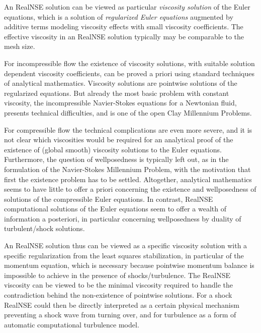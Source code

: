 An RealNSE solution can be viewed as particular \emph{viscosity solution}
of the Euler equations, which is a solution of \emph{regularized 
Euler equations} augmented by additive terms modeling viscosity
effects with small viscosity coefficients. The effective viscosity in an 
RealNSE solution typically may be comparable to the mesh size.

For incompressible flow the existence of viscosity solutions,
with suitable solution dependent viscosity coefficients, can
be proved a priori using standard techniques of analytical mathematics.
Viscosity solutions are pointwise solutions of the regularized 
equations. 
But already the most basic problem with constant viscosity,
the incompressible Navier-Stokes equations for a Newtonian fluid, presents
technical difficulties, and is one of the open Clay Millennium Problems.

For compressible flow the technical complications are even more
severe, and it is not clear which viscosities would be required 
for an analytical proof of the existence of (global smooth) viscosity 
solutions \cite{feireisl, chenwang} to the Euler equations.
Furthermore, the question of wellposedness is typically left out, 
as in the formulation of the Navier-Stokes Millennium Problem, 
with the motivation that first the existence problem has to be settled. 
Altogether, analytical mathematics seems to have little to offer a 
priori concerning
the existence and wellposedness of solutions of the compressible Euler 
equations.
In contrast, RealNSE computational solutions of the Euler equations
seem to offer a wealth of information a posteriori, in particular
concerning wellposedness by duality of turbulent/shock solutions.

An RealNSE solution thus can be viewed as a specific viscosity solution with 
a specific regularization from the least squares stabilization, in particular 
of the momentum equation, which is necessary because pointwise momentum balance
is impossible to achieve in the presence of shocks/turbulence. 
The RealNSE viscosity can be viewed
to be the minimal viscosity required to handle the contradiction
behind the non-existence of pointwise solutions.  
For a shock RealNSE could then be directly interpreted as  
a certain physical mechanism preventing a shock wave from turning over,
and for turbulence as a form of automatic computational turbulence
model.


